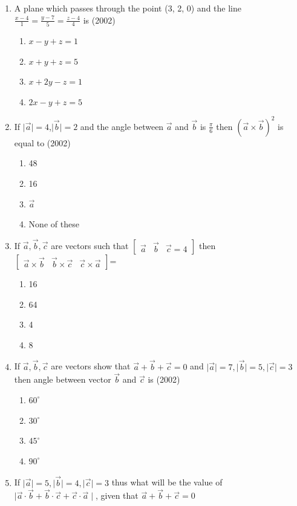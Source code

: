 \documentclass[12pt]{article}
\providecommand{\brak}[1]{\ensuremath{\left(#1\right)}}
\begin{document}
\begin{enumerate}
\item A plane which passes through the point (3, 2, 0) and the line $\frac{x-4}{1}=\frac{y-7}{5}=\frac{z-4}{4}$ is (2002)
\begin{enumerate}
\item $x-y+z=1$
\item $x+y+z=5$
\item $x+2y-z=1$
\item $2x-y+z=5$
\end{enumerate}
\item If  $\mid \vec{a} \mid =4$,$\mid \vec{b}  \mid =2$ and the angle between $\vec{a}$ and $\vec{b}$ is $\frac{\pi}{6}$ then $\brak{\vec{a}\times\vec{b}}^2$ is equal to (2002)
\begin{enumerate}
\item  48
\item 16
\item $\vec{a}$
\item None of these
\end{enumerate}
\item If $\vec{a},\vec{b},\vec{c}$ are vectors such that 
$
\begin{bmatrix}
\vec{a} & \vec{b} & \vec{c} =4
\end{bmatrix}$
then 
$
\begin{bmatrix}
 \vec{a}\times\vec{b} &\vec{b}\times \vec{c} & \vec{c}\times\vec{a}
\end{bmatrix}$=
\begin{enumerate}
\item 16
\item 64 
\item 4 
\item 8
\end{enumerate}
\item If $\vec{a},\vec{b},\vec{c}$ are vectors show that $\vec{a}+\vec{b}+\vec{c}=0$ and 
 $\mid \vec{a} \mid=7,\mid \vec{b} \mid=5,\mid \vec{c} \mid=3 $ then angle between vector $\vec{b}$ and $\vec{c}$ is (2002)
\begin{enumerate}
\item  $60^\circ $
\item  $30^\circ $
\item  $45^\circ $
\item  $90^\circ $
\end{enumerate}
\item If $\mid \vec{a} \mid=5,\mid \vec{b} \mid=4,\mid \vec{c} \mid=3 $ thus what will be the value of $\mid \vec{a} \cdot \vec{b}+\vec{b}\cdot\vec{c}+\vec{c}\cdot\vec{a} \mid$, given that $\vec{a}+\vec{b}+\vec{c}=0$

\end{enumerate}
\end{document}
